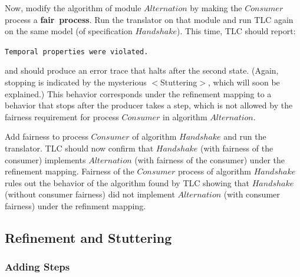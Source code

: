 \documentclass[fleqn,leqno]{article}
\begin{document}
Now, modify the algorithm of module $Alternation$ by making the
$Consumer$ process a \textbf{fair~process}.  Run the translator on
that module and run TLC again on the same model (of specification
$Handshake$).  This time, TLC should report:
\begin{display}
\tt Temporal properties were violated.
\end{display}
and should produce an error trace that halts after the second state.
(Again, stopping is indicated by the mysterious 
 $<$\textsf{Stuttering}$>$, which will soon be explained.)
This behavior corresponds under the refinement mapping to a behavior
that stops after the producer takes a step, which is not allowed by
the fairness requirement for process $Consumer$ in algorithm
$Alternation$.

Add fairness to process $Consumer$ of algorithm $Handshake$ and run
the translator.  TLC should now confirm that $Handshake$ (with
fairness of the consumer) implements $Alternation$ (with fairness of
the consumer) under the refinement mapping.  Fairness of the
$Consumer$ process of algorithm $Handshake$ rules out the behavior of
the algorithm found by TLC showing that $Handshake$ (without consumer
fairness) did not implement $Alternation$ (with consumer fairness)
under the refinment mapping.

\bigskip

\noindent
{}


\subsection{Refinement and Stuttering} 

\subsubsection{Adding Steps} 
\end{document}
